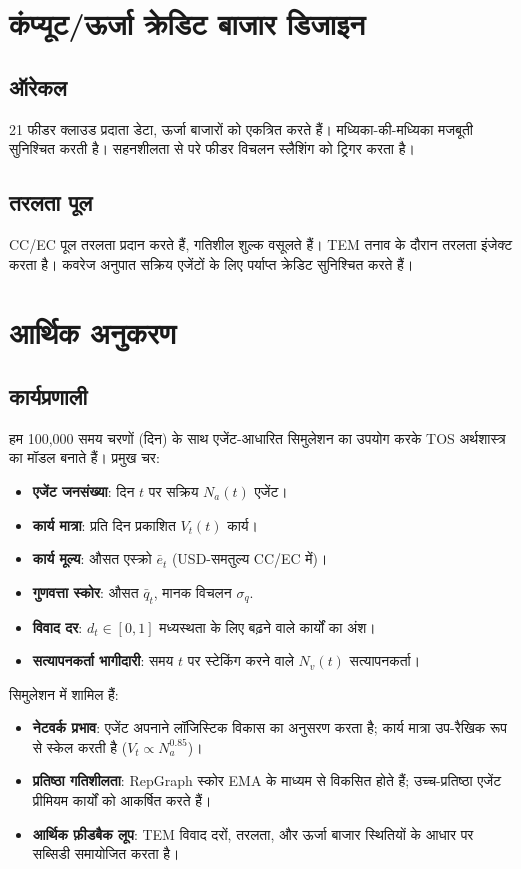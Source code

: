 \documentclass[11pt]{article}
\begin{document}
\begin{itemize}[noitemsep]
\begin{itemize}[noitemsep]
\section{कंप्यूट/ऊर्जा क्रेडिट बाजार डिजाइन}
\subsection{ऑरेकल}
21 फीडर क्लाउड प्रदाता डेटा, ऊर्जा बाजारों को एकत्रित करते हैं। मध्यिका-की-मध्यिका मजबूती सुनिश्चित करती है। सहनशीलता से परे फीडर विचलन स्लैशिंग को ट्रिगर करता है।

\subsection{तरलता पूल}
CC/EC पूल तरलता प्रदान करते हैं, गतिशील शुल्क वसूलते हैं। TEM तनाव के दौरान तरलता इंजेक्ट करता है। कवरेज अनुपात सक्रिय एजेंटों के लिए पर्याप्त क्रेडिट सुनिश्चित करते हैं।

\section{आर्थिक अनुकरण}
\label{sec:econ-sim}

\subsection{कार्यप्रणाली}
हम 100,000 समय चरणों (दिन) के साथ एजेंट-आधारित सिमुलेशन का उपयोग करके TOS अर्थशास्त्र का मॉडल बनाते हैं। प्रमुख चर:
\begin{itemize}[noitemsep]
  \item \textbf{एजेंट जनसंख्या}: दिन $t$ पर सक्रिय $N_a(t)$ एजेंट।
  \item \textbf{कार्य मात्रा}: प्रति दिन प्रकाशित $V_t(t)$ कार्य।
  \item \textbf{कार्य मूल्य}: औसत एस्क्रो $\bar{e}_t$ (USD-समतुल्य CC/EC में)।
  \item \textbf{गुणवत्ता स्कोर}: औसत $\bar{q}_t$, मानक विचलन $\sigma_q$.
  \item \textbf{विवाद दर}: $d_t \in [0,1]$ मध्यस्थता के लिए बढ़ने वाले कार्यों का अंश।
  \item \textbf{सत्यापनकर्ता भागीदारी}: समय $t$ पर स्टेकिंग करने वाले $N_v(t)$ सत्यापनकर्ता।
\end{itemize}
सिमुलेशन में शामिल हैं:
\begin{itemize}[noitemsep]
  \item \textbf{नेटवर्क प्रभाव}: एजेंट अपनाने लॉजिस्टिक विकास का अनुसरण करता है; कार्य मात्रा उप-रैखिक रूप से स्केल करती है ($V_t \propto N_a^{0.85}$)।
  \item \textbf{प्रतिष्ठा गतिशीलता}: RepGraph स्कोर EMA के माध्यम से विकसित होते हैं; उच्च-प्रतिष्ठा एजेंट प्रीमियम कार्यों को आकर्षित करते हैं।
  \item \textbf{आर्थिक फ़ीडबैक लूप}: TEM विवाद दरों, तरलता, और ऊर्जा बाजार स्थितियों के आधार पर सब्सिडी समायोजित करता है।
\end{itemize}


\end{itemize}
\end{itemize}
\end{document}
